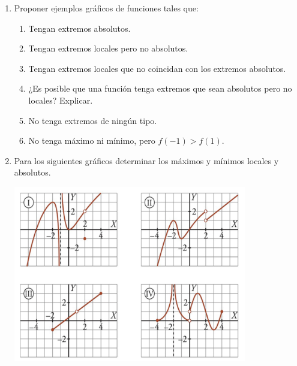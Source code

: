 \documentclass[12pt]{article}
\theoremstyle{definition}
\newtheorem*{mydef}{Definición}
\begin{document}
\begin{enumerate}
\item Proponer ejemplos gráficos de funciones tales que:\\
\begin{enumerate} [leftmargin=2cm]
\item Tengan extremos absolutos.
\item Tengan extremos locales pero no absolutos.
\item Tengan extremos locales que no coincidan con los extremos absolutos.
\item ¿Es posible que una función tenga extremos que sean absolutos pero no locales? Explicar.
\item  No tenga extremos de ningún tipo.
\item  No tenga máximo ni mínimo, pero $f(-1) > f(1)$.
\end{enumerate}


\item Para los siguientes gráficos determinar los máximos y mínimos locales y absolutos.
\begin{center} 
\includegraphics[width=0.8\textwidth]{tp2_fig14.jpg} 
\end{center}



\end{enumerate}
\end{document}
